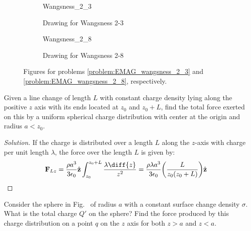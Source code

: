 \documentclass[crop=false,class=book,oneside]{standalone}
\begin{document}
            \begin{figure}[H]
                \centering
                \captionsetup{type=figure}
                \begin{subfigure}[b]{0.49\textwidth}
                    \centering
                    \captionsetup{type=figure}
                    {Wangsness_2_3}
                    \caption{Drawing for Wangsness 2-3}
                    \label{fig:EMAG_1_Wangsness_2_3}
                \end{subfigure}
                \begin{subfigure}[b]{0.49\textwidth}
                    \centering
                    \captionsetup{type=figure}
                    {Wangsness_2_8}
                    \caption{Drawing for Wangsness 2-8}
                    \label{fig:EMAG_1_wangsness_2_8}
                \end{subfigure}
                \caption[Figures for Wangsness 2-3 and 2-8]{%
                    Figures for problems \ref{problem:EMAG_wangsness_2_3}
                    and \ref{problem:EMAG_wangsness_2_8}, respectively.
                }
            \end{figure}
            \begin{problem}[Wangsness 2-7]
                Given a line change of length $L$ with constant charge
                density lying along the positive $z$ axis with its
                ends located at $z_{0}$ and $z_{0}+L$, find the total
                force exerted on this by a uniform spherical charge
                distribution with center at the origin
                and radius $a<z_{0}$.
            \end{problem}
            \begin{proof}[Solution]
                If the charge is distributed over a length $L$
                along the $z$-axis with charge per unit length $\lambda$,
                the force over the length $L$ is given by:
                \begin{equation*}
                    \mathbf{F}_{Lz}
                    =\frac{\rho a^{3}}{3\epsilon_{0}}\hat{\mathbf{z}}
                    \int_{z_{0}}^{z_{0}+L}\frac{\lambda\diff{z}}{z^{2}}
                    =\frac{\rho\lambda{a^{3}}}{3\epsilon_{0}}
                    \bigg(\frac{L}{z_{0}(z_{0}+L)}\bigg)
                    \hat{\mathbf{z}}
                \end{equation*}
            \end{proof}
            \begin{problem}[Wangsness 2-8]
                \label{problem:EMAG_wangsness_2_8}
                Consider the sphere in
                Fig.~
                of radius $a$ with a constant surface change density
                $\sigma$. What is the total charge $Q'$ on the sphere?
                Find the force produced by this charge distribution on a
                point $q$ on the $z$ axis for both $z>a$ and $z<a$.
            \end{problem}
\end{document}

